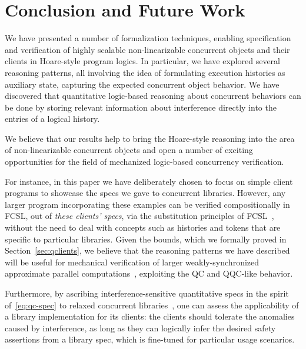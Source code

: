 
\section{Conclusion and Future Work}
\label{sec:conclusion}


We have presented a number of formalization techniques, enabling
specification and verification of highly scalable non-linearizable
concurrent objects and their clients in Hoare-style program logics.
%
In particular, we have explored several reasoning patterns, all
involving the idea of formulating execution histories as auxiliary
state, capturing the expected concurrent object behavior.
%
We have discovered that quantitative logic-based reasoning about
concurrent behaviors can be done by storing relevant information about
interference directly into the entries of a logical history.

We believe that our results help to bring the Hoare-style reasoning
into the area of non-linearizable concurrent objects and open a number
of exciting opportunities for the field of mechanized logic-based
concurrency verification.

For instance, in this paper we have deliberately chosen to focus on
simple client programs to showcase the specs we gave to concurrent
libraries. However, any larger program incorporating these examples
can be verified compositionally in FCSL, out of \emph{these clients'
  specs}, via the substitution principles of
FCSL~\cite{Nanevski-al:ESOP14,Sergey-al:PLDI15}, without the need to
deal with concepts such as histories and tokens that are specific to
particular libraries. Given the bounds, which we formally proved in
Section~\ref{sec:qclients}, we believe that the reasoning patterns we
have described will be useful for mechanical verification of larger
weakly-synchronized approximate parallel
computations~\cite{Rinard:RACES}, exploiting the QC and QQC-like
behavior.

Furthermore, by ascribing interference-sensitive quantitative specs in
the spirit of~\eqref{eq:qc-spec} to relaxed concurrent
libraries~\cite{Henzinger-al:POPL13}, one can assess the applicability
of a library implementation for its clients: the clients should
tolerate the anomalies caused by interference, as long as they can
logically infer the desired safety assertions from a library spec,
which is fine-tuned for particular usage scenarios.


